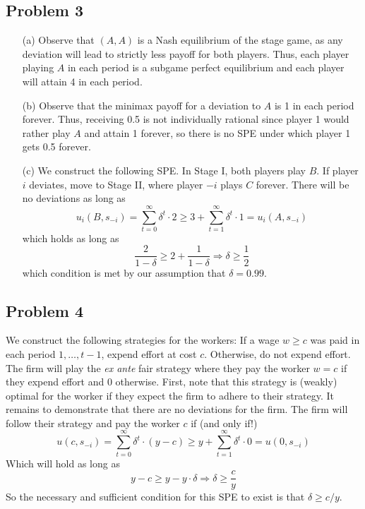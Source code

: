 \documentclass[10pt]{article}
\begin{document}
\subsection*{Problem 3}

\begin{itemize}
	\item[(a)] Observe that $(A,A)$ is a Nash equilibrium of the stage game, as any deviation will lead to strictly less payoff for both players. Thus, each player playing $A$ in each period is a subgame perfect equilibrium and each player will attain 4 in each period.
	\item[(b)] Observe that the minimax payoff for a deviation to $A$ is 1 in each period forever. Thus, receiving 0.5 is not individually rational since player 1 would rather play $A$ and attain 1 forever, so there is no SPE under which player 1 gets 0.5 forever.
	\item[(c)] We construct the following SPE. In Stage I, both players play $B$. If player $i$ deviates, move to Stage II, where player $-i$ plays $C$ forever. There will be no deviations as long as\[u_i(B,s_{-i}) = \sum_{t=0}^\infty \delta^t \cdot 2 \ge 3 + \sum_{t=1}^\infty \delta^t \cdot 1 = u_i(A,s_{-i})\]which holds as long as \[\frac{2}{1-\delta} \ge 2 + \frac{1}{1-\delta} \Longrightarrow \delta \ge \frac{1}{2}\]which condition is met by our assumption that $\delta = 0.99$.
\end{itemize}

\subsection*{Problem 4}

We construct the following strategies for the workers: If a wage $w \ge c$ was paid in each period $1,\dots,t-1$, expend effort at cost $c$. Otherwise, do not expend effort. The firm will play the \emph{ex ante} fair strategy where they pay the worker $w = c$ if they expend effort and 0 otherwise. First, note that this strategy is (weakly) optimal for the worker if they expect the firm to adhere to their strategy. It remains to demonstrate that there are no deviations for the firm. The firm will follow their strategy and pay the worker $c$ if (and only if!)\[u(c,s_{-i}) = \sum_{t=0}^\infty \delta^t \cdot (y - c) \ge y + \sum_{t=1}^\infty \delta^t \cdot 0 = u(0,s_{-i})\]Which will hold as long as \[y - c \ge y - y\cdot \delta \Longrightarrow \delta \ge \frac{c}{y}\]So the necessary and sufficient condition for this SPE to exist is that $\delta \ge c / y$.
\end{document}
